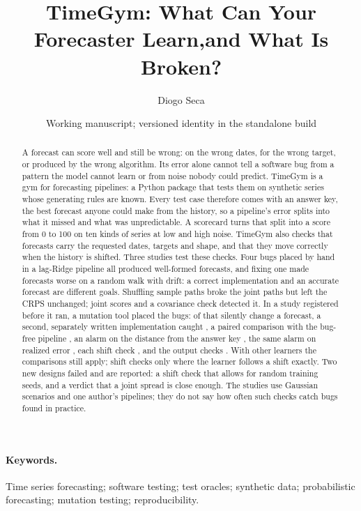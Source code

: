 \documentclass[11pt,a4paper]{article}
\title{TimeGym: What Can Your Forecaster Learn,\newline and What Is Broken?}
\author{Diogo Seca}
\date{Working manuscript; versioned identity in the standalone build}
\begin{document}
\maketitle

\begin{abstract}
A forecast can score well and still be wrong: on the wrong dates, for the
wrong target, or produced by the wrong algorithm. Its error alone cannot
tell a software bug from a pattern the model cannot learn or from noise
nobody could predict. TimeGym is a gym for forecasting pipelines: a Python
package that tests them on synthetic series whose generating rules are
known. Every test case therefore comes with an answer key, the best
forecast anyone could make from the history, so a pipeline's error splits
into what it missed and what was unpredictable. A scorecard turns that
split into a score from 0 to 100 on ten kinds of series at low and high
noise. TimeGym also checks that forecasts carry the requested dates,
targets and shape, and that they move correctly when the history is
shifted. Three studies test these checks. Four bugs placed by
hand in a lag-Ridge pipeline all produced well-formed forecasts, and
fixing one made forecasts worse on a random walk with drift: a correct
implementation and an accurate forecast are different goals. Shuffling
sample paths broke the joint paths but left the CRPS unchanged; joint
scores and a covariance check detected it. In a study registered before
it ran, a mutation tool placed the bugs: of \ThirdSilent{} that silently
change a forecast, a second, separately written implementation caught
\ThirdSecondCaught{}, a paired comparison with the bug-free pipeline
\ThirdPairedCaught{}, an alarm on the distance from the answer key
\ThirdKeyCaught{}, the same alarm on realized error \ThirdLossCaught{},
each shift check \ThirdShiftCaught{}, and the output checks
\ThirdOutputCaught{}. With other learners the comparisons
still apply; shift checks only where the learner follows a shift exactly.
Two new designs failed and are reported: a shift check that allows for
random training seeds, and a verdict that a joint spread is close enough.
The studies use Gaussian scenarios and one author's pipelines; they do not
say how often such checks catch bugs found in practice.
\end{abstract}

\paragraph{Keywords.} Time series forecasting; software testing; test oracles;
synthetic data; probabilistic forecasting; mutation testing; reproducibility.
\end{document}
